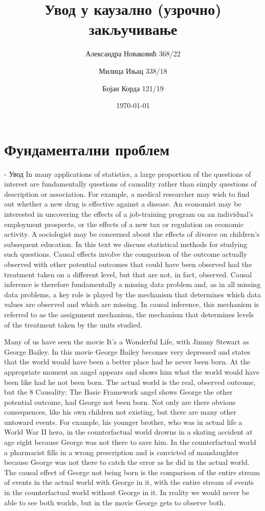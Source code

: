 \documentclass[12pt, a4paper]{article}
\title{Увод у каузално (узрочно) закључивање}
\author{Александра Новаковић 368/22}
\author{Милица Ињац 338/18}
\author{Бојан Корда 121/19}
\affil{Математички факултет, Универзитет у Београду}
\date{\today}
\begin{document}
\maketitle
\newpage

\tableofcontents
\newpage

\section{Фундаментални проблем}

- Увод
In many applications of statistics, a large proportion of the questions of interest are
fundamentally questions of causality rather than simply questions of description or association.
For example, a medical researcher may wish to find out whether a new drug is
effective against a disease. An economist may be interested in uncovering the effects of
a job-training program on an individual’s employment prospects, or the effects of a new
tax or regulation on economic activity. A sociologist may be concerned about the effects
of divorce on children’s subsequent education. In this text we discuss statistical methods
for studying such questions.
Causal effects involve the comparison of the outcome actually observed with other potential
outcomes that could have been observed had the treatment taken on a different level,
but that are not, in fact, observed. Causal inference is therefore fundamentally a missing
data problem and, as in all missing data problems, a key role is played by the mechanism
that determines which data values are observed and which are missing. In causal
inference, this mechanism is referred to as the assignment mechanism, the mechanism
that determines levels of the treatment taken by the units studied.

Many of us have seen the movie It’s a Wonderful Life, with
Jimmy Stewart as George Bailey. In this movie George Bailey becomes very depressed
and states that the world would have been a better place had he never been born. At
the appropriate moment an angel appears and shows him what the world would have
been like had he not been born. The actual world is the real, observed outcome, but the
8 Causality: The Basic Framework
angel shows George the other potential outcome, had George not been born. Not only are
there obvious consequences, like his own children not existing, but there are many other
untoward events. For example, his younger brother, who was in actual life a World War
II hero, in the counterfactual world drowns in a skating accident at age eight because
George was not there to save him. In the counterfactual world a pharmacist fills in a
wrong prescription and is convicted of manslaughter because George was not there to
catch the error as he did in the actual world. The causal effect of George not being born
is the comparison of the entire stream of events in the actual world with George in it, with
the entire stream of events in the counterfactual world without George in it. In reality we
would never be able to see both worlds, but in the movie George gets to observe both.
\end{document}
